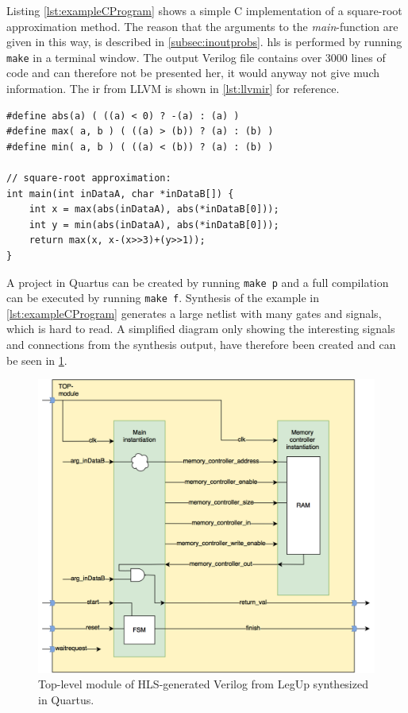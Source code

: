 \noindent
Listing \ref{lst:exampleCProgram} shows a simple C implementation of a square-root approximation method. The reason that the arguments to the \textit{main}-function are given in this way, is described in \cref{subsec:inoutprobs}. \gls{hls} is performed by running \verb!make! in a terminal window. The output Verilog file contains over 3000 lines of code and can therefore not be presented her, it would anyway not give much information. The \gls{ir} from LLVM is shown in \cref{lst:llvmir} for reference.
\lstset{language=C,style=Cstyle}
\begin{lstlisting}[caption={C example: square-root approximation},label=lst:exampleCProgram]
#define abs(a) ( ((a) < 0) ? -(a) : (a) )
#define max( a, b ) ( ((a) > (b)) ? (a) : (b) )
#define min( a, b ) ( ((a) < (b)) ? (a) : (b) )

// square-root approximation:
int main(int inDataA, char *inDataB[]) {
    int x = max(abs(inDataA), abs(*inDataB[0]));
    int y = min(abs(inDataA), abs(*inDataB[0]));
    return max(x, x-(x>>3)+(y>>1));
}
\end{lstlisting}
\noindent
A project in Quartus can be created by running \verb!make p! and a full compilation can be executed by running \verb!make f!. Synthesis of the example in \cref{lst:exampleCProgram} generates a large netlist with many gates and signals, which is hard to read. A simplified diagram only showing the interesting signals and connections from the synthesis output, have therefore been created and can be seen in \cref{fig:legupouttop}.
\begin{figure}[hbpt]
\centering
\includegraphics[width=\textwidth]{../figs/LegUpOutputTop.png}
\caption{\label{fig:legupouttop}Top-level module of HLS-generated Verilog from LegUp synthesized in Quartus.}
\end{figure}
